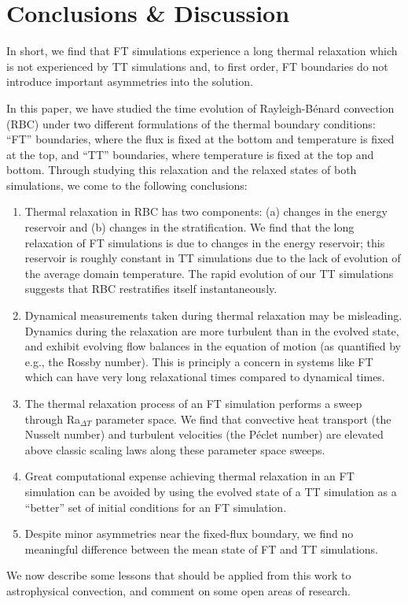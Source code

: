 \documentclass[aps, pre, onecolumn, nofootinbib, notitlepage, groupedaddress, amsfonts, amssymb, amsmath, longbibliography, superscriptaddress]{revtex4-1}
\newcommand{\RB}{Rayleigh-B\'{e}nard }
\newcommand{\ea}[1]{{\color{red} #1}}
\begin{document}

\section{Conclusions \& Discussion}
\label{sec:discussion}
In short, we find that FT simulations experience a long thermal relaxation which is not experienced by TT simulations and, to first order, FT boundaries do not introduce important asymmetries into the solution.

In this paper, we have studied the time evolution of \RB convection (RBC) under two different formulations of the thermal boundary conditions: ``FT'' boundaries, where the flux is fixed at the bottom and temperature is fixed at the top, and ``TT'' boundaries, where temperature is fixed at the top and bottom.
Through studying this relaxation and the relaxed states of both simulations, we come to the following conclusions:
\begin{enumerate}
\item Thermal relaxation in RBC has two components: (a) changes in the energy reservoir and (b) changes in the stratification.
We find that the long relaxation of FT simulations is due to changes in the energy reservoir; this reservoir is roughly constant in TT simulations due to the lack of evolution of the average domain temperature.
The rapid evolution of our TT simulations suggests that RBC restratifies itself instantaneously.
\item Dynamical measurements taken during thermal relaxation may be misleading.
Dynamics during the relaxation are more turbulent than in the evolved state, and exhibit evolving flow balances in the equation of motion (as quantified by e.g., the Rossby number).
\ea{This is principly a concern in systems like FT which can have very long relaxational times compared to dynamical times.}
\item The thermal relaxation process of an FT simulation performs a sweep through Ra$_{\Delta T}$ parameter space.
We find that convective heat transport (the Nusselt number) and turbulent velocities (the P\'{e}clet number) are elevated above classic scaling laws along these parameter space sweeps.
\item Great computational expense achieving thermal relaxation in an FT simulation can be avoided by using the evolved state of a TT simulation as a ``better'' set of initial conditions for an FT simulation.
\item Despite minor asymmetries near the fixed-flux boundary, we find no meaningful difference between the mean state of FT and TT simulations.
\end{enumerate}
We now describe some lessons that should be applied from this work to astrophysical convection, and comment on some open areas of research.
\end{document}
